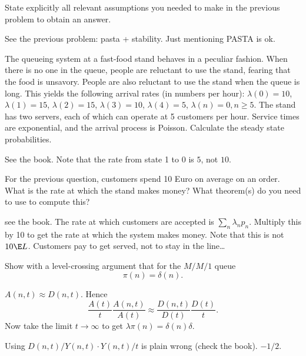 \begin{exercise}[201706]
State explicitly all relevant assumptions you needed to make in the previous problem to obtain an answer.
\begin{solution}
 See the previous problem: pasta + stability. Just mentioning PASTA is ok. 
\end{solution}
\end{exercise}



\begin{exercise}[201706]
 The queueing system at a fast-food stand behaves in a
 peculiar fashion. When there is no one in the queue, people are
 reluctant to use the stand, fearing that the food is
 unsavory. People are also reluctant to use the stand when the queue
 is long. This yields the following arrival rates (in numbers per hour): $\lambda(0) = 10$, $\lambda(1)=15$, $\lambda(2)=15$, $\lambda(3)=10$, $\lambda(4)=5$, $\lambda(n)=0, n\geq 5$. The stand has two servers, each of which can operate at 5 customers per hour. Service times are exponential, and the arrival process is Poisson. 
 Calculate the steady state probabilities.
\begin{solution}
 See the book. Note that the rate from state 1 to 0 is $5$, not $10$. 
\end{solution}
\end{exercise}


\begin{exercise}[201706]
 For the previous question, customers spend 10 Euro on average on an order.
 What is the rate at which the stand makes money?
 What theorem(s) do you need to use to compute this?
\begin{solution}
see the book. 
 The rate at which customers are accepted is $\sum_{n} \lambda_n p_n$. Multiply this by 10 to get the rate at which the system makes money. Note that this is not $10 \E L$. Customers pay to get served, not to stay in the line\ldots
\end{solution}
\end{exercise}


\begin{exercise}[201804] 
Show with a level-crossing argument that for the $M/M/1$ queue 
 \begin{equation}\label{eq:91}
 \pi(n) = \delta(n).
 \end{equation}

\begin{solution}
 $A(n,t) \approx D(n,t)$. Hence
 \begin{equation*}
 \frac{A(t)}{t} \frac{A(n,t)}{A(t)} \approx 
 \frac{D(n, t)}{D(t)} \frac{D(t)}{t}.
 \end{equation*}
Now take the limit $t\to \infty$ to get $\lambda \pi(n) = \delta(n) \delta$. 

Using $D(n,t)/Y(n,t) \cdot Y(n,t)/t$ is plain wrong (check the book). $-1/2$. 
\end{solution}
\end{exercise}

